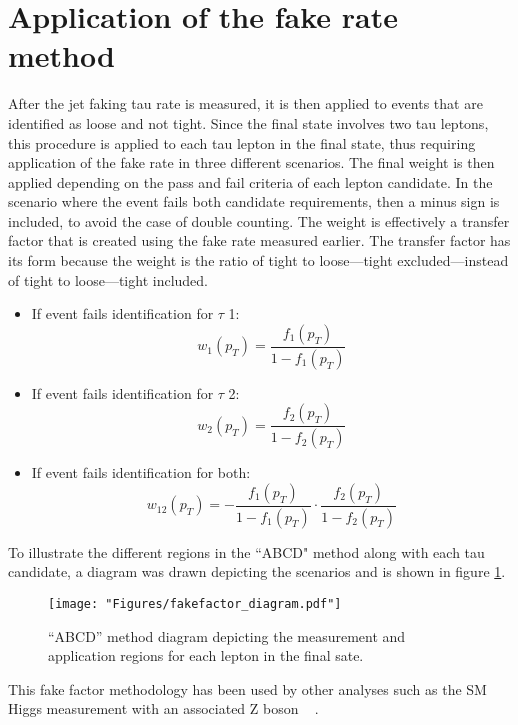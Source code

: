 \clearpage

\section{Application of the fake rate method}

After the jet faking tau rate is measured, it is then applied to events that are identified as loose and not tight. Since the final state involves two tau leptons, this procedure is applied to each tau lepton in the final state, thus requiring application of the fake rate in three different scenarios. The final weight is then applied depending on the pass and fail criteria of each lepton candidate. In the scenario where the event fails both candidate requirements, then a minus sign is included, to avoid the case of double counting.  
 The weight is effectively a transfer factor that is created using the fake rate measured earlier. The transfer factor has its form because the weight is the ratio of tight to loose---tight excluded---instead of tight to loose---tight included. 
\begin{itemize}
\item{If event fails identification for $\tau$ 1:\begin{equation}w_1(p_T)=\frac{f_{1}(p_T)}{1-f_{1}(p_T)}\end{equation}}
\item{If event fails identification for $\tau$ 2:\begin{equation}w_2(p_T)=\frac{f_{2}(p_T)}{1-f_{2}(p_T)}\end{equation}}
\item{If event fails identification for both:\begin{equation}w_{12}(p_T)=-\frac{f_{1}(p_T)}{1-f_{1}(p_T)}\cdot\frac{f_{2}(p_T)}{1-f_{2}(p_T)}\end{equation}}
\end{itemize}

To illustrate the different regions in the ``ABCD" method along with each tau candidate, a diagram was drawn depicting the scenarios and is shown in figure \ref{fig:fakefactor_reg}. 
\begin{figure}[ht!b]
  \texttt{[image: "Figures/fakefactor\_diagram.pdf"]}
    \caption{\label{fig:fakefactor_reg} ``ABCD'' method diagram depicting the measurement and application regions for each \tauh lepton in the final sate.}
\end{figure}

This fake factor methodology has been used by other analyses such as the SM Higgs measurement with an associated Z boson ~\cite{CMS-PAS-HIG-19-010} . 

